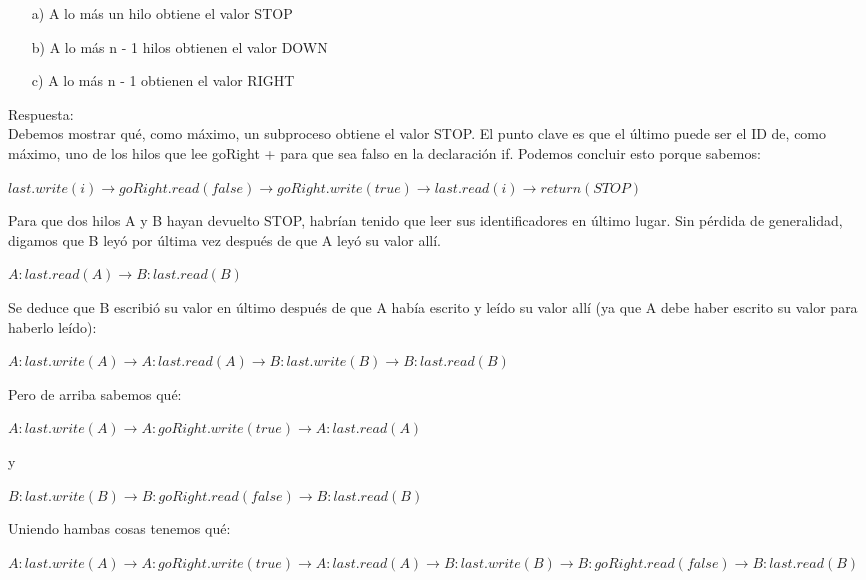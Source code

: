 \documentclass[12pt, letterpaper]{article}
\begin{document}
\begin{itemize}
\begin{itemize}
\item[a) ]A lo m\'as un hilo obtiene el valor STOP
\item[b) ]A lo m\'as n - 1 hilos obtienen el valor DOWN
\item[c) ]A lo m\'as n - 1 obtienen el valor RIGHT
\end{itemize}

Respuesta:\\
Debemos mostrar qu\'e, como m\'aximo, un subproceso obtiene el valor STOP.
El punto clave es que el último puede ser el ID de, como máximo, uno de los hilos que
lee goRight + para que sea falso en la declaraci\'on if.
Podemos concluir esto porque sabemos: 
\begin{center}
$last.write(i) \rightarrow goRight.read(false) \rightarrow goRight.write(true) \rightarrow last.read(i) \rightarrow return(STOP)$
\end{center}

Para que dos hilos A y B hayan devuelto STOP, habrían tenido que leer sus identificadores en \'ultimo lugar. Sin p\'erdida de generalidad, digamos que B ley\'o por \'ultima vez despu\'es de que A ley\'o su valor allí.

\begin{center}
$A:last.read(A) \rightarrow B:last.read(B)$
\end{center}

Se deduce que B escribi\'o su valor en \'ultimo después de que A hab\'ia escrito y le\'ido su valor
all\'i (ya que A debe haber escrito su valor para haberlo le\'ido):

\begin{center}

$A:last.write(A) \rightarrow A:last.read(A) \rightarrow B:last.write(B) \rightarrow B:last.read(B)$
\end{center}

Pero de arriba sabemos qu\'e:

\begin{center}
$A:last.write(A) \rightarrow A:goRight.write(true) \rightarrow A:last.read(A)$
\end{center}
y

\begin{center}
$B:last.write(B) \rightarrow B:goRight.read(false) \rightarrow B : last.read(B)$
\end{center}

Uniendo hambas cosas tenemos qu\'e:


\begin{center}
$A:last.write(A) \rightarrow A:goRight.write(true) \rightarrow A:last.read(A) \rightarrow B:last.write(B) \rightarrow B:goRight.read(false) \rightarrow B:last.read(B)$
\end{center}


\end{itemize}
\end{document}
